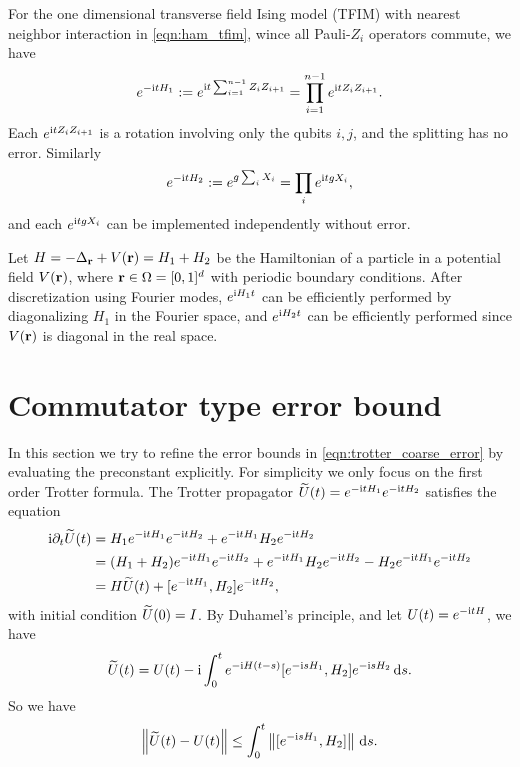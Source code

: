 \begin{exam}
For the one dimensional transverse field Ising model (TFIM) with nearest neighbor interaction in \cref{eqn:ham_tfim}, wince all Pauli-$Z_i$ operators commute, we have
\begin{equation}
e^{-\mathrm{i} t H_1}:=e^{\mathrm{i} t\sum_{i=1}^{n-1} Z_iZ_{i+1}}=\prod_{i=1}^{n-1} e^{\mathrm{i} t Z_i Z_{i+1}}.
\end{equation}
Each $e^{\mathrm{i} t Z_i Z_{i+1}}$ is a rotation involving only the qubits $i,j$, and the splitting has no error. 
Similarly
\begin{equation}
e^{-\mathrm{i} t H_2}:=e^{g\sum_{i} X_i}=\prod_{i} e^{\mathrm{i} t g X_i},
\end{equation}
and each $e^{\mathrm{i} t g X_i}$ can be implemented independently without error.
\end{exam}

\begin{exam}
Let $H=-\Delta_{\mathbf{r}}+V(\mathbf{r})=H_1+H_2$ be the Hamiltonian of a particle in a potential field $V(\mathbf{r})$, where $\mathbf{r}\in \Omega=[0,1]^d$ with periodic boundary conditions.
After discretization using Fourier modes,  $e^{\mathrm{i} H_1t}$ can be efficiently performed by diagonalizing $H_1$ in the Fourier space, and $e^{\mathrm{i} H_2t}$ can be efficiently performed since $V(\mathbf{r})$ is diagonal in the real space.
\end{exam}


\section{Commutator type error bound}

In this section we try to refine the error bounds in \cref{eqn:trotter_coarse_error} by evaluating the preconstant explicitly.
For simplicity we only focus on the first order Trotter formula. 
The Trotter propagator $\widetilde{U}(t)=e^{-\mathrm{i} t H_1}e^{-\mathrm{i} t H_2}$ satisfies the equation
\begin{equation}
\begin{aligned}
\mathrm{i}\partial_t \widetilde{U}(t)&=H_1 e^{-\mathrm{i} t H_1}e^{-\mathrm{i} t H_2}+e^{-\mathrm{i} t H_1}H_2e^{-\mathrm{i} t H_2}\\
&=(H_1+H_2)e^{-\mathrm{i} t H_1}e^{-\mathrm{i} t H_2}+e^{-\mathrm{i} t H_1}H_2e^{-\mathrm{i} t H_2}-H_2 e^{-\mathrm{i} t H_1}e^{-\mathrm{i} t H_2}\\
&=H\widetilde{U}(t)+[e^{-\mathrm{i} t H_1},H_2]e^{-\mathrm{i} t H_2},
\end{aligned}
\end{equation}
with initial condition $\widetilde{U}(0)=I$. 
By Duhamel's principle, and let $U(t)=e^{-\mathrm{i} t H}$, we have
\begin{equation}
\widetilde{U}(t)=U(t)-\mathrm{i}\int_{0}^{t} e^{-\mathrm{i} H (t-s)} [e^{-\mathrm{i} s H_1},H_2]e^{-\mathrm{i} s H_2}\,\mathrm{d} s.
\end{equation}
So we have
\begin{equation}
\left\lVert\widetilde{U}(t)-U(t)\right\rVert\le \int_{0}^{t} \left\lVert[e^{-\mathrm{i} s H_1},H_2]\right\rVert \,\mathrm{d} s.
\label{eqn:U_Trotter1bound_1}
\end{equation}

